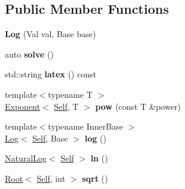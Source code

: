 \subsection*{Public Member Functions}
\begin{DoxyCompactItemize}
\item 
\hypertarget{classlatex_1_1math_1_1Log_acff6d6f36adff38cf7c0da719516c6bc}{{\bfseries Log} (Val val, Base base)}\label{classlatex_1_1math_1_1Log_acff6d6f36adff38cf7c0da719516c6bc}

\item 
\hypertarget{classlatex_1_1math_1_1Log_a5d9819331208c23d8978a3744d058f14}{auto {\bfseries solve} ()}\label{classlatex_1_1math_1_1Log_a5d9819331208c23d8978a3744d058f14}

\item 
\hypertarget{classlatex_1_1math_1_1Log_a1bc90c91e52e7858e33dcdaba673b7a9}{std\-::string {\bfseries latex} () const }\label{classlatex_1_1math_1_1Log_a1bc90c91e52e7858e33dcdaba673b7a9}

\item 
\hypertarget{classlatex_1_1math_1_1Log_a4819a4a9a01dd7dd65a0d2773c589976}{{\footnotesize template$<$typename T $>$ }\\\hyperlink{classlatex_1_1math_1_1Exponent}{Exponent}$<$ \hyperlink{classlatex_1_1math_1_1Root}{Self}, T $>$ {\bfseries pow} (const T \&power)}\label{classlatex_1_1math_1_1Log_a4819a4a9a01dd7dd65a0d2773c589976}

\item 
\hypertarget{classlatex_1_1math_1_1Log_aacf7a5312839b22b33fcb67ed3f51fde}{{\footnotesize template$<$typename Inner\-Base $>$ }\\\hyperlink{classlatex_1_1math_1_1Log}{Log}$<$ \hyperlink{classlatex_1_1math_1_1Root}{Self}, Base $>$ {\bfseries log} ()}\label{classlatex_1_1math_1_1Log_aacf7a5312839b22b33fcb67ed3f51fde}

\item 
\hypertarget{classlatex_1_1math_1_1Log_a6ae7bf3b1ce862280b67b58f69d5c793}{\hyperlink{classlatex_1_1math_1_1NaturalLog}{Natural\-Log}$<$ \hyperlink{classlatex_1_1math_1_1Root}{Self} $>$ {\bfseries ln} ()}\label{classlatex_1_1math_1_1Log_a6ae7bf3b1ce862280b67b58f69d5c793}

\item 
\hypertarget{classlatex_1_1math_1_1Log_a980f02ee52b6b81f1c7e7ccf75521a67}{\hyperlink{classlatex_1_1math_1_1Root}{Root}$<$ \hyperlink{classlatex_1_1math_1_1Root}{Self}, int $>$ {\bfseries sqrt} ()}\label{classlatex_1_1math_1_1Log_a980f02ee52b6b81f1c7e7ccf75521a67}

\end{DoxyCompactItemize}

